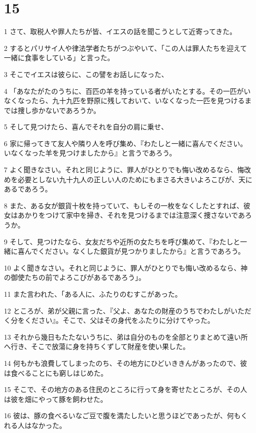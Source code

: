 \chapter{15}

\par 1 さて、取税人や罪人たちが皆、イエスの話を聞こうとして近寄ってきた。
\par 2 するとパリサイ人や律法学者たちがつぶやいて、「この人は罪人たちを迎えて一緒に食事をしている」と言った。
\par 3 そこでイエスは彼らに、この譬をお話しになった、
\par 4 「あなたがたのうちに、百匹の羊を持っている者がいたとする。その一匹がいなくなったら、九十九匹を野原に残しておいて、いなくなった一匹を見つけるまでは捜し歩かないであろうか。
\par 5 そして見つけたら、喜んでそれを自分の肩に乗せ、
\par 6 家に帰ってきて友人や隣り人を呼び集め、『わたしと一緒に喜んでください。いなくなった羊を見つけましたから』と言うであろう。
\par 7 よく聞きなさい。それと同じように、罪人がひとりでも悔い改めるなら、悔改めを必要としない九十九人の正しい人のためにもまさる大きいよろこびが、天にあるであろう。
\par 8 また、ある女が銀貨十枚を持っていて、もしその一枚をなくしたとすれば、彼女はあかりをつけて家中を掃き、それを見つけるまでは注意深く捜さないであろうか。
\par 9 そして、見つけたなら、女友だちや近所の女たちを呼び集めて、『わたしと一緒に喜んでください。なくした銀貨が見つかりましたから』と言うであろう。
\par 10 よく聞きなさい。それと同じように、罪人がひとりでも悔い改めるなら、神の御使たちの前でよろこびがあるであろう」。
\par 11 また言われた、「ある人に、ふたりのむすこがあった。
\par 12 ところが、弟が父親に言った、『父よ、あなたの財産のうちでわたしがいただく分をください』。そこで、父はその身代をふたりに分けてやった。
\par 13 それから幾日もたたないうちに、弟は自分のものを全部とりまとめて遠い所へ行き、そこで放蕩に身を持ちくずして財産を使い果した。
\par 14 何もかも浪費してしまったのち、その地方にひどいききんがあったので、彼は食べることにも窮しはじめた。
\par 15 そこで、その地方のある住民のところに行って身を寄せたところが、その人は彼を畑にやって豚を飼わせた。
\par 16 彼は、豚の食べるいなご豆で腹を満たしたいと思うほどであったが、何もくれる人はなかった。
